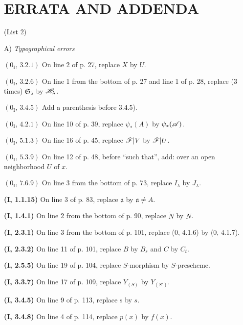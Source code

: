 \clearpage
\thispagestyle{empty}
\null
\clearpage

\section*{ERRATA AND ADDENDA}
\begin{center}
(List 2)

\medskip
A) \emph{Typographical errors}
\end{center}

\noindent\textbf{$(0_{\mathrm I},\,3.2.1)$} On line 2 of p. 27, replace $X$
by $U$.

\noindent\textbf{$(0_{\mathrm I},\,3.2.6)$} On line 1 from the bottom of p.
27 and line 1 of p. 28, replace (3 times) $\mathfrak S_\lambda$ by
$\mathscr{H}_\lambda$.

\noindent\textbf{$(0_{\mathrm I},\,3.4.5)$} Add a parenthesis before 3.4.5).

\noindent\textbf{$(0_{\mathrm I},\,4.2.1)$} On line 10 of p. 39, replace
$\psi_*(A)$ by $\psi_*(\mathscr{A})$.

\noindent\textbf{$(0_{\mathrm I},\,5.1.3)$} On line 16 of p. 45, replace
$\mathscr{F}|V$ by $\mathscr{F}|U$.

\noindent\textbf{$(0_{\mathrm I},\,5.3.9)$} On line 12 of p. 48, before
``such that'', add: over an open neighborhood $U$ of $x$.

\noindent\textbf{$(0_{\mathrm I},\,7.6.9)$} On line 3 from the bottom of p.
73, replace $I_\lambda$ by $J_\lambda$.

\noindent\textbf{(I, 1.1.15)} On line 3 of p. 83, replace $\mathfrak a$ by
$\mathfrak a\ne A$.

\noindent\textbf{(I, 1.4.1)} On line 2 from the bottom of p. 90, replace
$\widetilde N$ by $N$.

\noindent\textbf{(I, 2.3.1)} On line 3 from the bottom of p. 101, replace (0,
4.1.6) by (0, 4.1.7).

\noindent\textbf{(I, 2.3.2)} On line 11 of p. 101, replace $B$ by $B_s$ and
$C$ by $C_t$.

\noindent\textbf{(I, 2.5.5)} On line 19 of p. 104, replace $S$-morphism by
$S$-prescheme.

\noindent\textbf{(I, 3.3.7)} On line 17 of p. 109, replace $Y_{(S)}$ by
$Y_{(S')}$.

\noindent\textbf{(I, 3.4.5)} On line 9 of p. 113, replace $\mathrm s$ by $s$.

\noindent\textbf{(I, 3.4.8)} On line 4 of p. 114, replace $p(x)$ by $f(x)$.

